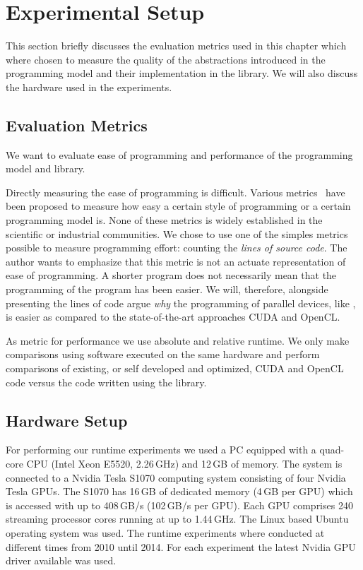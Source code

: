 \section{Experimental Setup}
\label{sec:skelcl:experimental_setup}
This section briefly discusses the evaluation metrics used in this chapter which where chosen to measure the quality of the abstractions introduced in the \SkelCL programming model and their implementation in the \SkelCL library.
We will also discuss the hardware used in the experiments.


\subsection{Evaluation Metrics}
We want to evaluate ease of programming and performance of the \SkelCL programming model and library.

Directly measuring the ease of programming is difficult.
Various metrics~\cite{} have been proposed to measure how easy a certain style of programming or a certain programming model is.
None of these metrics is widely established in the scientific or industrial communities.
We chose to use one of the simples metrics possible to measure programming effort: counting the \emph{lines of source code}.
The author wants to emphasize that this metric is not an actuate representation of ease of programming.
A shorter program does not necessarily mean that the programming of the program has been easier.
We will, therefore, alongside presenting the lines of code argue \emph{why} the programming of parallel devices, like \GPUs, is easier as compared to the state-of-the-art approaches CUDA and OpenCL.

As metric for performance we use absolute and relative runtime.
We only make comparisons using software executed on the same hardware and perform comparisons of existing, or self developed and optimized, CUDA and OpenCL code versus the code written using the \SkelCL library.

\subsection{Hardware Setup}
For performing our runtime experiments we used a PC equipped with a quad-core CPU (Intel Xeon E5520, 2.26\,GHz) and 12\,GB of memory.
The system is connected to a Nvidia Tesla S1070 computing system consisting of four Nvidia Tesla GPUs.
The S1070 has 16\,GB of dedicated memory (4\,GB per GPU) which is accessed with up to 408\,GB/s (102\,GB/s per GPU).
Each GPU comprises 240 streaming processor cores running at up to 1.44\,GHz.
The Linux based Ubuntu operating system was used.
The runtime experiments where conducted at different times from 2010 until 2014.
For each experiment the latest Nvidia GPU driver available was used.

